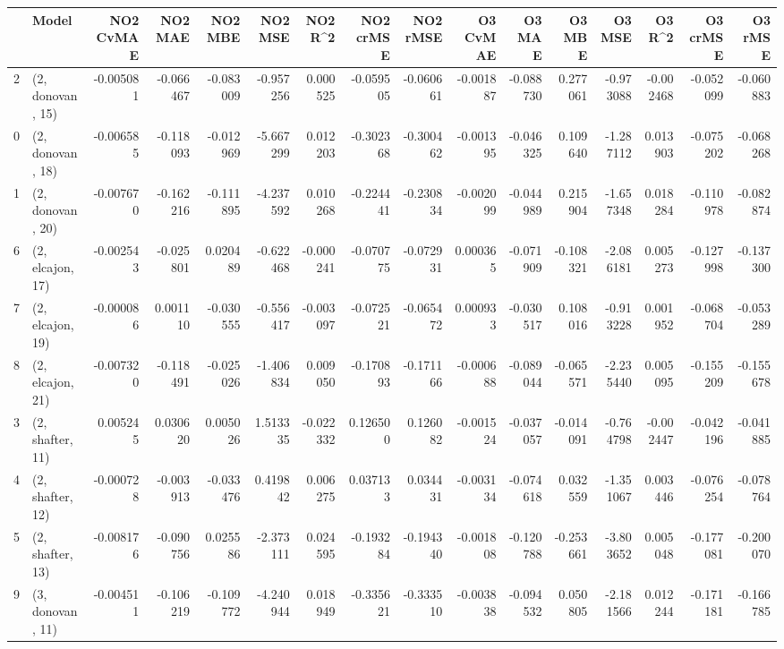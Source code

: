 \begin{tabular}{llrrrrrrrrrrrrrr}
\toprule
{} &             Model &  NO2 CvMAE &   NO2 MAE &   NO2 MBE &    NO2 MSE &   NO2 R\textasciicircum2 &  NO2 crMSE &  NO2 rMSE &  O3 CvMAE &    O3 MAE &    O3 MBE &     O3 MSE &    O3 R\textasciicircum2 &  O3 crMSE &   O3 rMSE \\
\midrule
2  &  (2, donovan, 15) &  -0.005081 & -0.066467 & -0.083009 &  -0.957256 &  0.000525 &  -0.059505 & -0.060661 & -0.001887 & -0.088730 &  0.277061 &  -0.973088 & -0.002468 & -0.052099 & -0.060883 \\
0  &  (2, donovan, 18) &  -0.006585 & -0.118093 & -0.012969 &  -5.667299 &  0.012203 &  -0.302368 & -0.300462 & -0.001395 & -0.046325 &  0.109640 &  -1.287112 &  0.013903 & -0.075202 & -0.068268 \\
1  &  (2, donovan, 20) &  -0.007670 & -0.162216 & -0.111895 &  -4.237592 &  0.010268 &  -0.224441 & -0.230834 & -0.002099 & -0.044989 &  0.215904 &  -1.657348 &  0.018284 & -0.110978 & -0.082874 \\
6  &  (2, elcajon, 17) &  -0.002543 & -0.025801 &  0.020489 &  -0.622468 & -0.000241 &  -0.070775 & -0.072931 &  0.000365 & -0.071909 & -0.108321 &  -2.086181 &  0.005273 & -0.127998 & -0.137300 \\
7  &  (2, elcajon, 19) &  -0.000086 &  0.001110 & -0.030555 &  -0.556417 & -0.003097 &  -0.072521 & -0.065472 &  0.000933 & -0.030517 &  0.108016 &  -0.913228 &  0.001952 & -0.068704 & -0.053289 \\
8  &  (2, elcajon, 21) &  -0.007320 & -0.118491 & -0.025026 &  -1.406834 &  0.009050 &  -0.170893 & -0.171166 & -0.000688 & -0.089044 & -0.065571 &  -2.235440 &  0.005095 & -0.155209 & -0.155678 \\
3  &  (2, shafter, 11) &   0.005245 &  0.030620 &  0.005026 &   1.513335 & -0.022332 &   0.126500 &  0.126082 & -0.001524 & -0.037057 & -0.014091 &  -0.764798 & -0.002447 & -0.042196 & -0.041885 \\
4  &  (2, shafter, 12) &  -0.000728 & -0.003913 & -0.033476 &   0.419842 &  0.006275 &   0.037133 &  0.034431 & -0.003134 & -0.074618 &  0.032559 &  -1.351067 &  0.003446 & -0.076254 & -0.078764 \\
5  &  (2, shafter, 13) &  -0.008176 & -0.090756 &  0.025586 &  -2.373111 &  0.024595 &  -0.193284 & -0.194340 & -0.001808 & -0.120788 & -0.253661 &  -3.803652 &  0.005048 & -0.177081 & -0.200070 \\
9  &  (3, donovan, 11) &  -0.004511 & -0.106219 & -0.109772 &  -4.240944 &  0.018949 &  -0.335621 & -0.333510 & -0.003838 & -0.094532 &  0.050805 &  -2.181566 &  0.012244 & -0.171181 & -0.166785 \\

\end{tabular}
